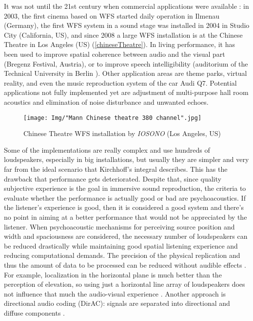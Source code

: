 It was not until the 21st century when commercial applications were available \cite{Brandenburg2009}: in 2003, the first cinema based on WFS started daily operation in Ilmenau (Germany), the first WFS system in a sound stage was installed in 2004 in Studio City (California, US), and since 2008 a large WFS installation is at the Chinese Theatre in Los Angeles (US) (\autoref{chineseTheatre}). In living performance, it has been used to improve spatial coherence between audio and the visual part (Bregenz Festival, Austria), or to improve speech intelligibility (auditorium of the Technical University in Berlin \cite{Musicology}). Other application areas are theme parks, virtual reality, and even the music reproduction system of the car Audi Q7. Potential applications not fully implemented yet are adjustment of multi-purpose hall room acoustics and elimination of noise disturbance and unwanted echoes.

\begin{figure}[h]
	\centering
	\texttt{[image: Img/"Mann Chinese theatre 380 channel".jpg]}
	\caption{Chinese Theatre WFS installation by \emph{IOSONO} (Los Angeles, US)}
	\label{chineseTheatre}
\end{figure}

Some of the implementations are really complex and use hundreds of loudspeakers, especially in big installations, but usually they are simpler and very far from the ideal scenario that Kirchhoff's integral describes. This has the drawback that performance gets deteriorated. Despite that, since quality subjective experience is the goal in immersive sound reproduction, the criteria to evaluate whether the performance is actually good or bad are psychoacoustics. If the listener's experience is good, then it is considered a good system and there's no point in aiming at a better performance that would not be appreciated by the listener.
When psychoacoustic mechanisms for perceiving source position and width and spaciousness are considered, the necessary number of loudspeakers can be reduced drastically while maintaining good spatial listening experience and reducing computational demands. The precision of the physical replication and thus the amount of data to be processed can be reduced without audible effects \cite{Musicology}. For example, localization in the horizontal plane is much better than the perception of elevation, so using just a horizontal line array of loudspeakers does not influence that much the audio-visual experience \cite{Brandenburg2009}. Another approach is directional audio coding (DirAC): signals are separated into directional and diffuse components \cite{Musicology}.

